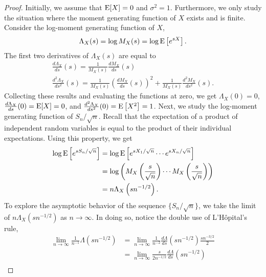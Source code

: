\begin{proof}
Initially, we assume that $\mathrm{E} [X] = 0$ and $\sigma^2 = 1$.
Furthermore, we only study the situation where the moment generating function of $X$ exists and is finite.
Consider the log-moment generating function of $X$,
\begin{equation*}
\Lambda_X (s) = \log M_X (s)
= \log \mathrm{E} \left[ e^{sX} \right] .
\end{equation*}
The first two derivatives of $\Lambda_X (s)$ are equal to
\begin{gather*}
\frac{d \Lambda_X}{ds} (s)
= \frac{1}{M_X (s)} \frac{d M_X}{ds} (s) \\
\frac{d^2 \Lambda_X}{ds^2} (s)
= \frac{1}{M_X (s)} \left( \frac{d M_X}{ds} (s) \right)^2
+ \frac{1}{M_X (s)} \frac{d^2 M_X}{ds^2} (s) .
\end{gather*}
Collecting these results and evaluating the functions at zero, we get $\Lambda_X (0) = 0$, $\frac{d \Lambda_X}{ds} (0) = \mathrm{E} [X] = 0$, and $\frac{d^2 \Lambda_X}{ds^2} (0) = \mathrm{E} \left[ X^2 \right] = 1$.
Next, we study the log-moment generating function of $S_n / \sqrt{n}$.
Recall that the expectation of a product of independent random variables is equal to the product of their individual expectations.
Using this property, we get
\begin{equation*}
\begin{split}
\log \mathrm{E} \left[ e^{s S_n / \sqrt{n} } \right]
&= \log \mathrm{E} \left[ e^{s X_1 / \sqrt{n} }
\cdots e^{s X_n / \sqrt{n} } \right] \\
&= \log \left( M_X \left( \frac{s}{\sqrt{n}} \right)
\cdots M_X \left( \frac{s}{\sqrt{n}} \right) \right) \\
&= n \Lambda_X \left( s n^{-1/2} \right) .
\end{split}
\end{equation*}
To explore the asymptotic behavior of the sequence $\{ S_n / \sqrt{n} \}$, we take the limit of $n \Lambda_X \left( s n^{-1/2} \right)$ as $n \rightarrow \infty$.
In doing so, notice the double use of L'H\^{o}pital's rule,
\begin{equation*}
\begin{split}
\lim_{n \rightarrow \infty} \frac{1}{n^{-1}} \Lambda \left( s n^{-1/2} \right)
&= \lim_{n \rightarrow \infty} \frac{1}{n^{-2}}
\frac{d \Lambda}{ds} \left( s n^{-1/2} \right) \frac{s n^{-3/2}}{2} \\
&= \lim_{n \rightarrow \infty} \frac{s}{2 n^{-1/2}}
\frac{d \Lambda}{ds} \left( s n^{-1/2} \right) \\

\end{split}
\end{equation*}
\end{proof}
